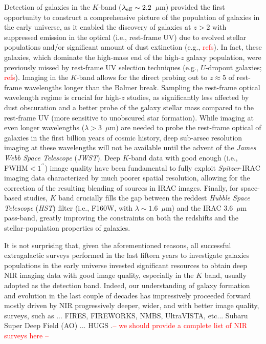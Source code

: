 \documentclass[preprint2]{aastex6}
\begin{document}
Detection of galaxies in the $K$-band ($\lambda_{\rm eff} \sim 2.2$~$\mu$m) provided the first opportunity to construct a comprehensive picture of the population of galaxies in the early universe, as it enabled the discovery of galaxies at $z > 2$ with suppressed emission in the optical (i.e., rest-frame UV) due to evolved stellar populations and/or significant amount of dust extinction (e.g., \textcolor{red}{refs}). In fact, these galaxies, which dominate the high-mass end of the high-$z$ galaxy population, were previously missed by rest-frame UV selection techniques (e.g., $U$-dropout galaxies; \textcolor{red}{refs}). Imaging in the $K$-band allows for the direct probing out to $z\approx5$ of rest-frame wavelengths longer than the Balmer break. Sampling the rest-frame optical wavelength regime is crucial for high-$z$ studies, as significantly less affected by dust obscuration and a better probe of the galaxy stellar mass compared to the rest-frame UV (more sensitive to unobscured star formation). While imaging at even longer wavelengths ($\lambda>3$~$\mu$m) are needed to probe the rest-frame optical of galaxies in the first billion years of cosmic history, deep sub-arsec resolution imaging at these wavelengths will not be available until the advent of the {\it James Webb Space Telescope} ({\it JWST}). Deep $K$-band data with good enough (i.e., FWHM$<1^{\prime \prime}$) image quality have been fundamental to fully exploit {\it Spitzer}-IRAC imaging data characterized by much poorer spatial resolution, allowing for the correction of the resulting blending of sources in IRAC images. Finally, for space-based studies, $K$ band crucially fills the gap between the reddest {\it Hubble Space Telescope} ({\it HST}) filter (i.e., F160W, with $\lambda \sim 1.6$~$\mu$m) and the IRAC 3.6~$\mu$m pass-band, greatly improving the constraints on both the redshifts and the stellar-population properties of galaxies. 

It is not surprising that, given the aforementioned reasons, all successful extragalactic surveys performed in the last fifteen years to investigate galaxies populations in the early universe invested significant resources to obtain deep NIR imaging data with good image quality, especially in the $K$ band, usually adopted as the detection band. Indeed, our understanding of galaxy formation and evolution in the last couple of decades has impressively proceeded forward mostly driven by NIR progressively deeper, wider, and with better image quality, surveys, such as ...  FIRES, FIREWORKS, NMBS, UltraVISTA, etc... Subaru Super Deep Field (AO) \cite{minowa:05}... HUGS \citep{hugs}.\textcolor{red}{-- we should provide a complete list of NIR surveys here -- }
\end{document}
